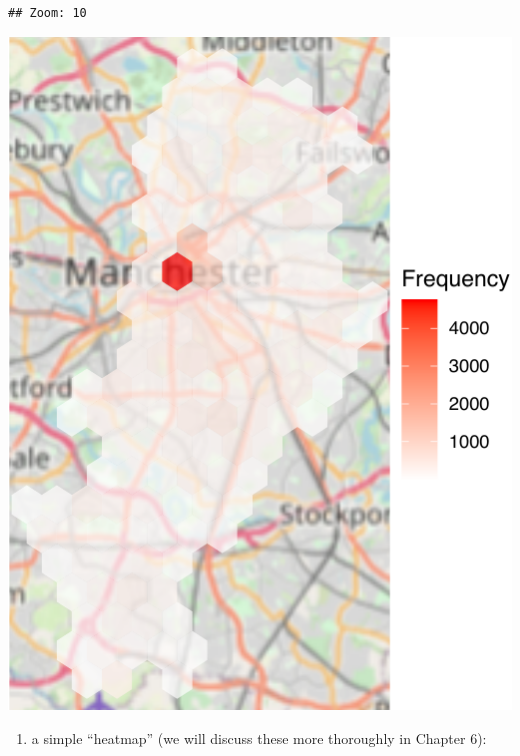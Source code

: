 \documentclass[
  krantz2]{krantz}
\providecommand{\tightlist}{%
  \setlength{\itemsep}{0pt}\setlength{\parskip}{0pt}}
\begin{document}
\begin{verbatim}
## Zoom: 10
\end{verbatim}

\includegraphics{crime_mapping_files/figure-latex/unnamed-chunk-129-1.pdf}

\begin{enumerate}
\def\labelenumi{\alph{enumi})}
\setcounter{enumi}{2}
\tightlist
\item
  a simple ``heatmap'' (we will discuss these more thoroughly in Chapter 6):
\end{enumerate}
\end{document}
